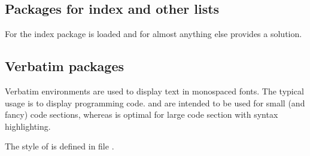

\subsection{Packages for index and other lists}
\label{sec:packages:index}

For the index package  is loaded and for almost anything else  provides a solution.



\subsection{Verbatim packages}
\label{sec:packages:verbatim}

Verbatim environments are used to display text in monospaced fonts. The typical usage is to display programming code.  and  are intended to be used for small (and fancy) code sections, whereas  is optimal for large code section with syntax highlighting.

The style of  is defined in file 
.


